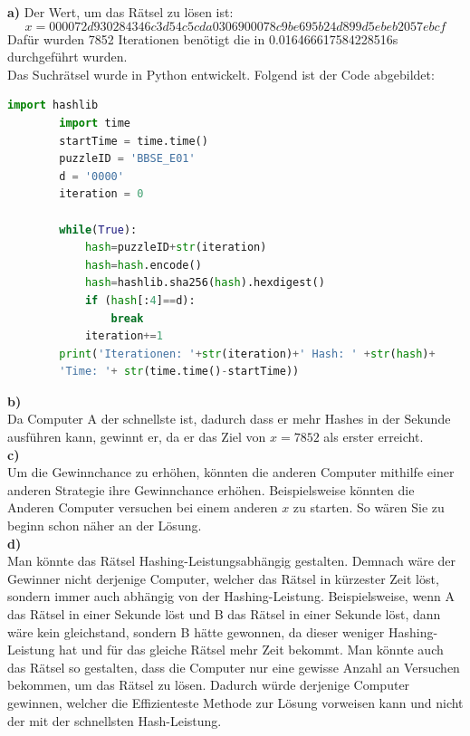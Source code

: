 \documentclass[german]{../uebung}
\begin{document}
\begin{exercise}{4}\textbf{a)}
    Der Wert, um das Rätsel zu lösen ist: \[x=000072d930284346c3d54c5cda0306900078c9be695b24d899d5ebeb2057ebcf\] Dafür wurden 7852 Iterationen benötigt die in 0.016466617584228516s durchgeführt wurden.\\
    Das Suchrätsel wurde in Python entwickelt. Folgend ist der Code abgebildet:
    \begin{lstlisting}[language=Python]
        import hashlib 
        import time 
        startTime = time.time() 
        puzzleID = 'BBSE_E01' 
        d = '0000'
        iteration = 0
        
        while(True):
            hash=puzzleID+str(iteration)
            hash=hash.encode()
            hash=hashlib.sha256(hash).hexdigest()
            if (hash[:4]==d):
                break
            iteration+=1
        print('Iterationen: '+str(iteration)+' Hash: ' +str(hash)+
        'Time: '+ str(time.time()-startTime))
    \end{lstlisting}
    \textbf{b)}\\
    Da Computer A der schnellste ist, dadurch dass er mehr Hashes in der Sekunde ausführen kann, gewinnt er, da er das Ziel von \(x=7852\) als erster erreicht.\\
    \textbf{c)}\\
    Um die Gewinnchance zu erhöhen, könnten die anderen Computer mithilfe einer anderen Strategie ihre Gewinnchance erhöhen. Beispielsweise könnten die Anderen Computer versuchen bei einem anderen \(x\) zu starten. So wären Sie zu beginn schon näher an der Lösung.\\
    \textbf{d)}\\
    Man könnte das Rätsel Hashing-Leistungsabhängig gestalten. Demnach wäre der Gewinner nicht derjenige Computer, welcher das Rätsel in kürzester Zeit löst, sondern immer auch abhängig von der Hashing-Leistung. Beispielsweise, wenn A das Rätsel in einer Sekunde löst und B das Rätsel in einer Sekunde löst, dann wäre kein gleichstand, sondern B hätte gewonnen, da dieser weniger Hashing-Leistung hat und für das gleiche Rätsel mehr Zeit bekommt.
    Man könnte auch das Rätsel so gestalten, dass die Computer nur eine gewisse Anzahl an Versuchen bekommen, um das Rätsel zu lösen. Dadurch würde derjenige Computer gewinnen, welcher die Effizienteste Methode zur Lösung vorweisen kann und nicht der mit der schnellsten Hash-Leistung.\\
\end{exercise}\\
\end{document}
